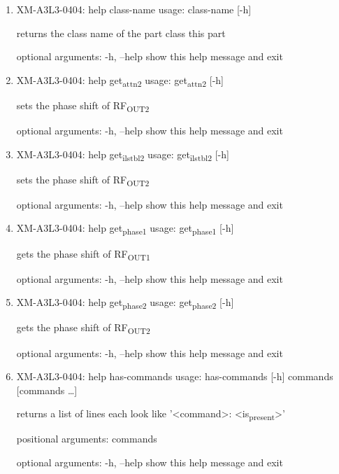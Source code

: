 \documentclass[11pt]{article}
\begin{document}
\begin{enumerate}
\item XM-A3L3-0404: help class-name
\label{sec:orgade8ea2}
usage: class-name [-h]

returns the class name of the part class this part

optional arguments:
  -h, --help  show this help message and exit

\item XM-A3L3-0404: help get\textsubscript{attn}\textsubscript{2}
\label{sec:org7557b2a}
usage: get\textsubscript{attn}\textsubscript{2} [-h]

sets the phase shift of RF\textsubscript{OUT2}

optional arguments:
  -h, --help  show this help message and exit

\item XM-A3L3-0404: help get\textsubscript{il}\textsubscript{stbl}\textsubscript{2}
\label{sec:org597b724}
usage: get\textsubscript{il}\textsubscript{stbl}\textsubscript{2} [-h]

sets the phase shift of RF\textsubscript{OUT2}

optional arguments:
  -h, --help  show this help message and exit

\item XM-A3L3-0404: help get\textsubscript{phase}\textsubscript{1}
\label{sec:org25583aa}
usage: get\textsubscript{phase}\textsubscript{1} [-h]

gets the phase shift of RF\textsubscript{OUT1}

optional arguments:
  -h, --help  show this help message and exit

\item XM-A3L3-0404: help get\textsubscript{phase}\textsubscript{2}
\label{sec:org5b19b50}
usage: get\textsubscript{phase}\textsubscript{2} [-h]

gets the phase shift of RF\textsubscript{OUT2}

optional arguments:
  -h, --help  show this help message and exit

\item XM-A3L3-0404: help has-commands
\label{sec:org1efed7c}
usage: has-commands [-h] commands [commands \ldots{}]

returns a list of lines each look like '<command>: <is\textsubscript{present}>'

positional arguments:
  commands

optional arguments:
  -h, --help  show this help message and exit


\end{enumerate}
\end{document}
